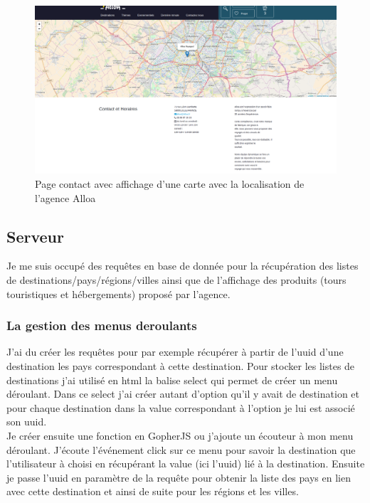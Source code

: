 \documentclass[12pt,a4paper]{report}
\begin{document}
\begin{figure}[h]
\centerline{\includegraphics[scale=0.3]{leaflet.png}}
\caption{Page contact avec affichage d'une carte avec la localisation de l'agence Alloa}
\label{image_hyooper}
\end{figure}

\subsection{Serveur}
 Je me suis occupé des requêtes en base de donnée pour la récupération des listes de destinations/pays/régions/villes ainsi que de l'affichage des produits (tours touristiques et hébergements) proposé par l'agence.\\

\subsubsection{La gestion des menus deroulants}
J'ai du créer les requêtes pour par exemple récupérer à partir de l'uuid d'une destination les pays correspondant à cette destination. Pour stocker les listes de destinations j'ai utilisé en html la balise select qui permet de créer un menu déroulant. Dans ce select j'ai créer autant d'option qu'il y avait de destination et pour chaque destination dans la value correspondant à l'option je lui est associé son uuid.\\

Je créer ensuite une fonction en GopherJS ou j'ajoute un écouteur à mon menu déroulant.  J'écoute l'événement click sur ce menu pour savoir la destination que l'utilisateur à choisi en récupérant la value (ici l'uuid) lié  à la destination. Ensuite je passe l'uuid en paramètre de la requête pour obtenir la liste des pays en lien avec cette destination et ainsi de suite pour les régions et les villes. \\
\end{document}
